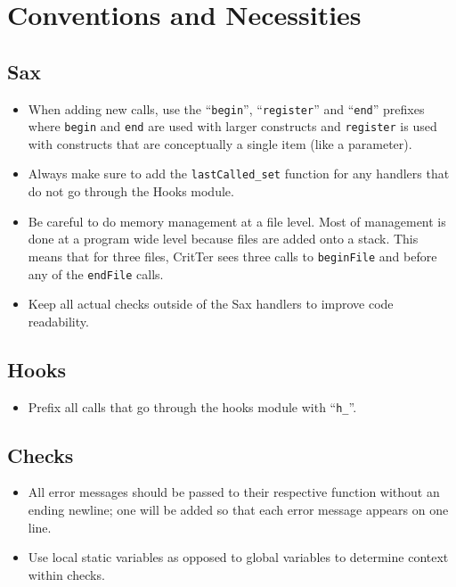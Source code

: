 \documentclass[12pt]{report}
\newcommand{\todoin}{\todo[inline]}
\newcommand{\programName}{CritTer\xspace}
\begin{document}
\appendix
\chapter{Conventions and Necessities}
\todoin{DynArray uses}
\section{Sax}
\begin{itemize}
\item When adding new calls, use the ``\lstinline{begin}'', ``\lstinline{register}'' and ``\lstinline{end}'' prefixes where \lstinline{begin} and \lstinline{end} are used with larger constructs and \lstinline{register} is used with constructs that are conceptually a single item (like a parameter).
\item Always make sure to add the \lstinline{lastCalled_set} function for any handlers that do not go through the Hooks module.
\item Be careful to do memory management at a file level. Most of management is done at a program wide level because files are added onto a stack. This means that for three files, \programName sees three calls to \lstinline{beginFile} and before any of the \lstinline{endFile} calls.
\item Keep all actual checks outside of the Sax handlers to improve code readability.
\end{itemize}

\section{Hooks}
\begin{itemize}
\item Prefix all calls that go through the hooks module with ``\lstinline{h_}''.

\end{itemize}

\section{Checks}
\begin{itemize}
\item All error messages should be passed to their respective function without an ending newline; one 
will be added so that each error message appears on one line.
\item Use local static variables as opposed to global variables to determine context within checks.
\end{itemize}

\nocite{*}

\clearpage
{}
{}

\end{document}
